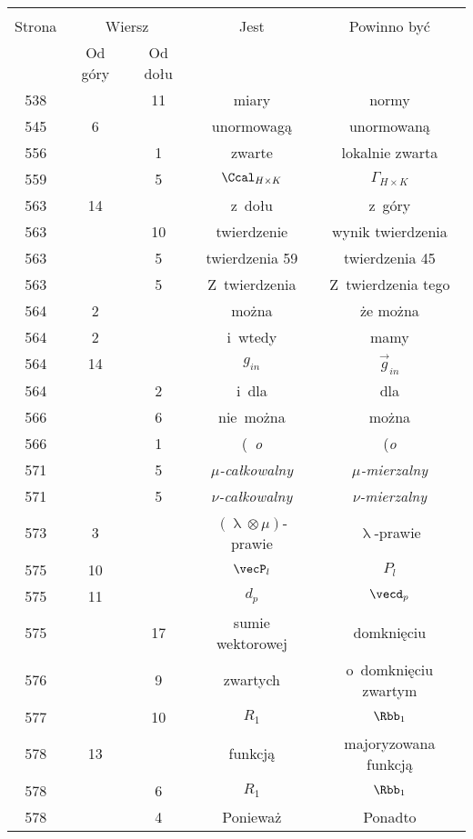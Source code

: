 \documentclass[a4paper,11pt]{article}
\numberwithin{equation}{section}
\renewcommand{\lambda}{\uplambda}
\begin{document}
\begin{center}
  \begin{tabular}{|c|c|c|c|c|}
    \hline
    & \multicolumn{2}{c|}{} & & \\
    Strona & \multicolumn{2}{c|}{Wiersz} & Jest
                              & Powinno być \\ \cline{2-3}
    & Od góry & Od dołu & & \\
    \hline
    538 & & 11 & miary & normy \\
    545 &  6 & & unormowagą & unormowaną \\
    556 & &  1 & zwarte & lokalnie zwarta \\
    559 & &  5 & $\Ccal_{ H \times K }$ & $\Gamma_{ H \times K }$ \\
    563 & 14 & & z~dołu & z~góry \\
    563 & & 10 & twierdzenie & wynik twierdzenia \\
    563 & &  5 & twierdzenia 59 & twierdzenia 45 \\
    563 & &  5 & Z~twierdzenia & Z~twierdzenia tego \\
    564 &  2 & & można & że można \\
    564 &  2 & & i~wtedy & mamy \\
    564 & 14 & & $g_{ i n }$ & $\vec{ g }_{ i n }$ \\
    564 & &  2 & i~dla & dla \\
    566 & &  6 & nie~można & można \\
    566 & &  1 & (~\textit{o} & (\textit{o} \\
    571 & &  5 & \textit{$\mu$-całkowalny}
           & \textit{$\mu$-mierzalny} \\
    571 & &  5 & \textit{$\nu$-całkowalny}
           & \textit{$\nu$-mierzalny} \\
    573 &  3 & & $( \lambda \otimes \mu )$-prawie & $\lambda$-prawie \\
    575 & 10 & & $\vecP_{ l }$ & $P_{ l }$ \\
    575 & 11 & & $d_{ p }$ & $\vecd_{ p }$ \\
    575 & & 17 & sumie wektorowej & domknięciu \\
    576 & &  9 & zwartych & o~domknięciu zwartym \\
    577 & & 10 & $R_{ 1 }$ & $\Rbb_{ 1 }$ \\
    578 & 13 & & funkcją & majoryzowana funkcją \\
    578 & &  6 & $R_{ 1 }$ & $\Rbb_{ 1 }$ \\
    578 & &  4 & Ponieważ & Ponadto \\

\end{tabular}
\end{center}
\end{document}
